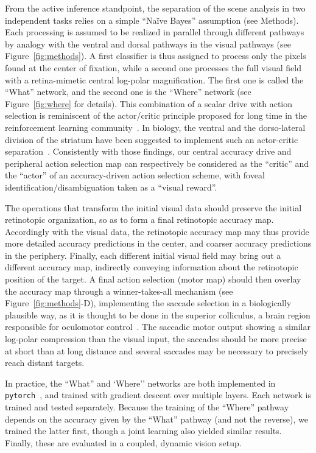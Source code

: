 From the active inference standpoint, the separation of the scene analysis in two independent tasks relies on a simple ``Naïve Bayes'' assumption (see Methods).
Each processing is assumed to be realized in parallel through different pathways by analogy with the ventral and dorsal pathways in the visual pathways (see Figure~\ref{fig:methods}). A first classifier is thus assigned to process only the pixels found at the center of fixation, while a second one processes the full visual field with a retina-mimetic central log-polar magnification. The first one is called the ``What'' network, and the second one is the ``Where'' network (see Figure~\ref{fig:where} for details). This combination of a scalar drive with action selection is reminiscent of the actor/critic principle proposed for long time in the reinforcement learning community~\cite{sutton1998reinforcement}. In biology, the ventral and the dorso-lateral division of the striatum have been suggested to implement such an actor-critic separation~\cite{joel2002actor, takahashi2008silencing}. Consistently with those findings, our central accuracy drive and peripheral action selection map can respectively be considered as the ``critic'' and the ``actor'' of an accuracy-driven action selection scheme, with foveal identification/disambiguation taken as a ``visual reward''.

The operations that transform the initial visual data should preserve the initial retinotopic organization, so as to form a final retinotopic accuracy map. Accordingly with the visual data, the retinotopic accuracy map may thus provide more detailed accuracy predictions in the center, and coarser accuracy predictions in the periphery. Finally, each different initial visual field may bring out a different accuracy map, indirectly conveying information about the retinotopic position of the target. A final action selection (motor map) should then overlay the accuracy map through a winner-takes-all mechanism (see Figure~\ref{fig:methods}-D), implementing the saccade selection in a biologically plausible way, as it is thought to be done in the superior colliculus, a brain region responsible for oculomotor control~\cite{sparks1987sensory}. The saccadic motor output showing a similar log-polar compression than the visual input, the saccades should be more precise at short than at long distance and several saccades may be necessary to precisely reach distant targets. %

In practice, the ``What'' and `Where'' networks are both implemented in \texttt{pytorch}~\cite{NEURIPS2019_9015}, and trained with gradient descent over multiple layers. %
Each network is trained and tested separately. Because the training of the ``Where'' pathway depends on the accuracy given by the ``What'' pathway (and not the reverse), we trained the latter first, though a joint learning also yielded similar results. %
Finally, these are evaluated in a coupled, dynamic vision setup.
